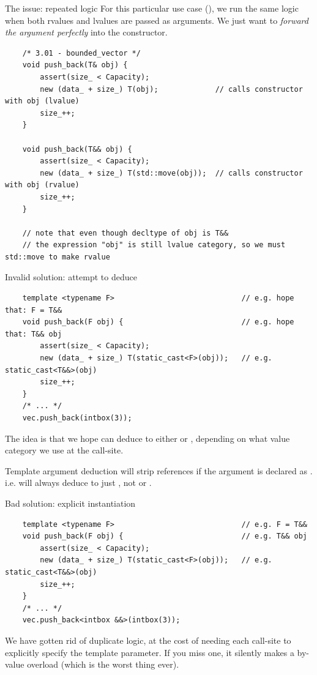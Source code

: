 \begin{frame}[fragile]{The issue: repeated logic}
  For this particular use case (), we run the same logic
  when both rvalues and lvalues are passed as arguments. 
  We just want to \emph{forward the argument perfectly} into the constructor.

  \begin{verbatim}
    /* 3.01 - bounded_vector */
    void push_back(T& obj) {
        assert(size_ < Capacity);
        new (data_ + size_) T(obj);             // calls constructor with obj (lvalue)
        size_++;
    }

    void push_back(T&& obj) {
        assert(size_ < Capacity);
        new (data_ + size_) T(std::move(obj));  // calls constructor with obj (rvalue)
        size_++;
    }

    // note that even though decltype of obj is T&&
    // the expression "obj" is still lvalue category, so we must std::move to make rvalue
  \end{verbatim}
\end{frame}

\begin{frame}[fragile]{Invalid solution: attempt to deduce }
  \begin{verbatim}
    template <typename F>                             // e.g. hope that: F = T&&
    void push_back(F obj) {                           // e.g. hope that: T&& obj
        assert(size_ < Capacity);
        new (data_ + size_) T(static_cast<F>(obj));   // e.g. static_cast<T&&>(obj)
        size_++;
    }
    /* ... */
    vec.push_back(intbox(3));
  \end{verbatim}

  The idea is that we hope  can deduce to either  or ,
  depending on what value category we use at the call-site.

  \begin{sqt:result}
    Template argument deduction will strip references if the argument is declared as .
    i.e.  will always deduce to just , not  or .
  \end{sqt:result}
\end{frame}

\begin{frame}[fragile]{Bad solution: explicit instantiation}
  \begin{verbatim}
    template <typename F>                             // e.g. F = T&&
    void push_back(F obj) {                           // e.g. T&& obj
        assert(size_ < Capacity);
        new (data_ + size_) T(static_cast<F>(obj));   // e.g. static_cast<T&&>(obj)
        size_++;
    }
    /* ... */
    vec.push_back<intbox &&>(intbox(3));
  \end{verbatim}

  We have gotten rid of duplicate logic, at the cost of needing each call-site
  to explicitly specify the template parameter. If you miss one, it silently
  makes a by-value overload (which is the worst thing ever).  
\end{frame}

